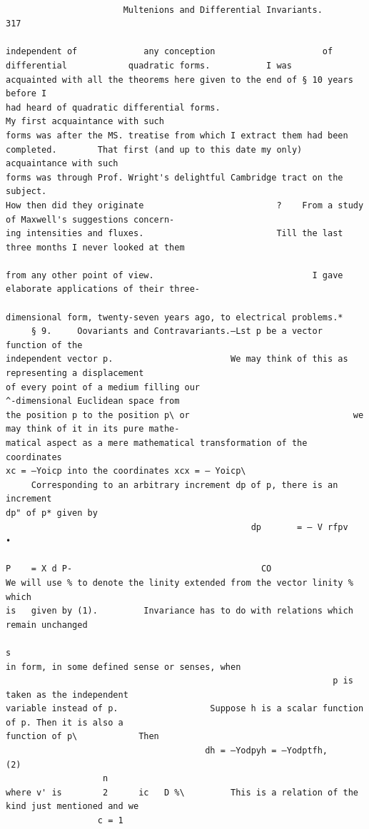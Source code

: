 \documentclass[10pt]{article}
\begin{document}
\clearpage
\begin{verbatim}

                       Multenions and Differential Invariants.                                                             317

independent of             any conception                     of     differential            quadratic forms.           I was
acquainted with all the theorems here given to the end of § 10 years before I
had heard of quadratic differential forms.                                       My first acquaintance with such
forms was after the MS. treatise from which I extract them had been
completed.        That first (and up to this date my only) acquaintance with such
forms was through Prof. Wright's delightful Cambridge tract on the subject.
How then did they originate                          ?    From a study of Maxwell's suggestions concern-
ing intensities and fluxes.                          Till the last three months I never looked at them

from any other point of view.                               I gave elaborate applications of their three-

dimensional form, twenty-seven years ago, to electrical problems.*
     § 9.     Oovariants and Contravariants.—Lst p be a vector function of the
independent vector p.                       We may think of this as representing a displacement
of every point of a medium filling our                                ^-dimensional Euclidean space from
the position p to the position p\ or                                we may think of it in its pure mathe-
matical aspect as a mere mathematical transformation of the coordinates
xc = —Yoicp into the coordinates xcx = — Yoicp\
     Corresponding to an arbitrary increment dp of p, there is an increment
dp" of p* given by
                                                dp       = — V rfpv      •
                                                                             P    = X d P-                                     CO
We will use % to denote the linity extended from the vector linity % which
is   given by (1).         Invariance has to do with relations which remain unchanged
                                                                                    s
in form, in some defined sense or senses, when
                                                                p is taken as the independent
variable instead of p.                  Suppose h is a scalar function of p. Then it is also a
function of p\            Then
                                       dh = —Yodpyh = —Yodptfh,                                                                (2)
                   n
where v' is        2      ic   D %\         This is a relation of the kind just mentioned and we
                  c = 1


\end{verbatim}
\end{document}
